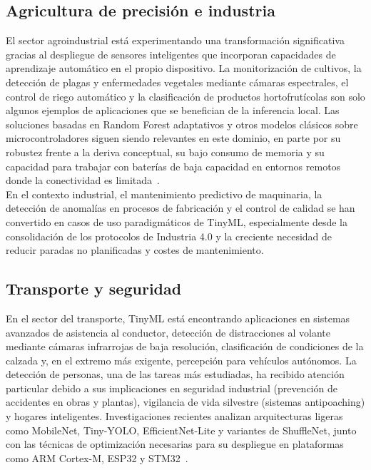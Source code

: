 \documentclass[a4paper,12pt,twoside,final]{book}
\begin{document}
\subsection{Agricultura de precisión e industria}
El sector agroindustrial está experimentando una transformación significativa gracias al despliegue de sensores
inteligentes que incorporan capacidades de aprendizaje automático en el propio dispositivo. La monitorización de
cultivos, la detección de plagas y enfermedades vegetales mediante cámaras espectrales, el control de riego
automático y la clasificación de productos hortofrutícolas son solo algunos ejemplos de aplicaciones que se
benefician de la inferencia local. Las soluciones basadas en Random Forest adaptativos y otros modelos clásicos
sobre microcontroladores siguen siendo relevantes en este dominio, en parte por su robustez frente a la deriva
conceptual, su bajo consumo de memoria y su capacidad para trabajar con baterías de baja capacidad en entornos
remotos donde la conectividad es limitada~\cite{daghero2021vlsi}.\\

En el contexto industrial, el mantenimiento predictivo de maquinaria, la detección de anomalías en procesos de
fabricación y el control de calidad se han convertido en casos de uso paradigmáticos de TinyML, especialmente desde
la consolidación de los protocolos de Industria 4.0 y la creciente necesidad de reducir paradas no planificadas y
costes de mantenimiento.

\subsection{Transporte y seguridad}
En el sector del transporte, TinyML está encontrando aplicaciones en sistemas avanzados de asistencia al conductor,
detección de distracciones al volante mediante cámaras infrarrojas de baja resolución, clasificación de condiciones
de la calzada y, en el extremo más exigente, percepción para vehículos autónomos. La detección de personas, una de
las tareas más estudiadas, ha recibido atención particular debido a sus implicaciones en seguridad industrial
(prevención de accidentes en obras y plantas), vigilancia de vida silvestre (sistemas antipoaching) y hogares
inteligentes. Investigaciones recientes analizan arquitecturas ligeras como MobileNet, Tiny-YOLO, EfficientNet-Lite
y variantes de ShuffleNet, junto con las técnicas de optimización necesarias para su despliegue en plataformas como
ARM Cortex-M, ESP32 y STM32~\cite{abadade2023ieeeaccess,somvanshi2025acm}.\\
\end{document}
